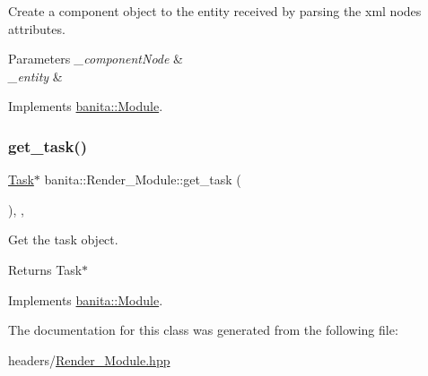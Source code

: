 Create a component object to the entity received by parsing the xml node\textquotesingle{}s attributes. 


\begin{DoxyParams}{Parameters}
{\em \+\_\+component\+Node} & \\
\hline
{\em \+\_\+entity} & \\
\hline
\end{DoxyParams}


Implements \mbox{\hyperlink{classbanita_1_1_module_ace6d7ce15d60044f233d30a43dc961dd}{banita\+::\+Module}}.

\mbox{\label{classbanita_1_1_render___module_a0fbb9b466fa3fd8f55a0898a4aa87bd0}} 
\subsubsection{\texorpdfstring{get\_task()}{get\_task()}}
{\footnotesize\ttfamily \mbox{\hyperlink{classbanita_1_1_task}{Task}}$\ast$ banita\+::\+Render\+\_\+\+Module\+::get\+\_\+task (\begin{DoxyParamCaption}{ }\end{DoxyParamCaption})\hspace{0.3cm}{\ttfamily [inline]}, {\ttfamily [override]}, {\ttfamily [virtual]}}



Get the task object. 

\begin{DoxyReturn}{Returns}
Task$\ast$ 
\end{DoxyReturn}


Implements \mbox{\hyperlink{classbanita_1_1_module_a8e29c0b6d7e11a39dac3c0879ef513d9}{banita\+::\+Module}}.



The documentation for this class was generated from the following file\+:\begin{DoxyCompactItemize}
\item 
headers/\mbox{\hyperlink{_render___module_8hpp}{Render\+\_\+\+Module.\+hpp}}\end{DoxyCompactItemize}
